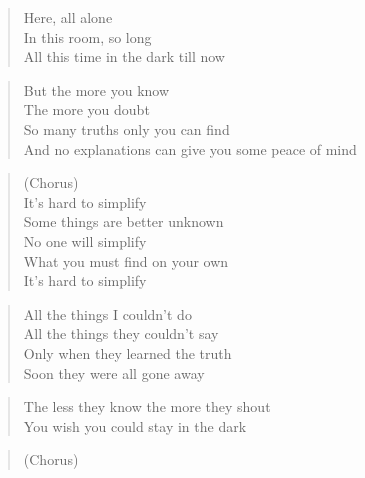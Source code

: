 \phantom{;}
\clearpage



\begin{verse}
Here, all alone \\
In this room, so long \\
All this time in the dark till now
\end{verse}

\begin{verse}
But the more you know \\
The more you doubt \\
So many truths only you can find \\
And no explanations can give you some peace of mind
\end{verse}

\begin{verse}
(Chorus) \\
It's hard to simplify \\
Some things are better unknown \\
No one will simplify \\
What you must find on your own \\
It's hard to simplify
\end{verse}

\begin{verse}
All the things I couldn't do \\
All the things they couldn't say \\
Only when they learned the truth \\
Soon they were all gone away
\end{verse}

\begin{verse}
The less they know the more they shout \\
You wish you could stay in the dark
\end{verse}

\begin{verse}
(Chorus)
\end{verse}

\clearpage

